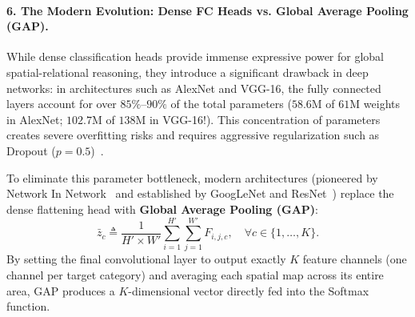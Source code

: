 \paragraph{6. The Modern Evolution: Dense FC Heads vs. Global Average Pooling (GAP).}
While dense classification heads provide immense expressive power for global spatial-relational reasoning, they introduce a significant drawback in deep networks: in architectures such as AlexNet and VGG-16, the fully connected layers account for over $85\%$--$90\%$ of the total parameters ($58.6\text{M}$ of $61\text{M}$ weights in AlexNet; $102.7\text{M}$ of $138\text{M}$ in VGG-16!). This concentration of parameters creates severe overfitting risks and requires aggressive regularization such as Dropout ($p=0.5$)~\cite{srivastava2014dropout}.

To eliminate this parameter bottleneck, modern architectures (pioneered by Network In Network~\cite{lin2013network} and established by GoogLeNet and ResNet~\cite{he2016deep}) replace the dense flattening head with \textbf{Global Average Pooling (GAP)}:
\begin{equation}
\bar{z}_c \triangleq \frac{1}{H' \times W'} \sum_{i=1}^{H'} \sum_{j=1}^{W'} F_{i, j, c}, \quad \forall c \in \{1, \dots, K\}.
\label{eq:gap_formula}
\end{equation}
By setting the final convolutional layer to output exactly $K$ feature channels (one channel per target category) and averaging each spatial map across its entire area, GAP produces a $K$-dimensional vector directly fed into the Softmax function.


